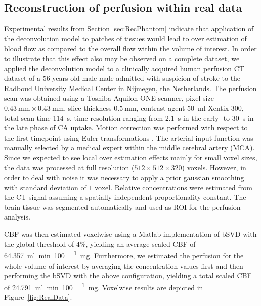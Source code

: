 \documentclass[journal,twocolumn]{IEEEtran}
\begin{document}
	
	\subsection{Reconstruction of perfusion within real data}\label{sec:RealData}
 	Experimental results from Section \ref{sec:RecPhantom} indicate that application of the deconvolution model to patches of tissues would lead to over estimation of blood flow as compared to the overall flow within the volume of interest.
	In order to illustrate that this effect also may be observed on a complete dataset, we applied the deconvolution model to a clinically acquired human perfusion CT dataset of a 56 years old male male admitted with suspicion of stroke to the Radboud University Medical Center in Nijmegen, the Netherlands.
	The perfusion scan was obtained using a Toshiba Aquilon ONE scanner, pixel-size $\SI{0.43}{\milli\meter}\times\SI{0.43}{\milli\meter}$, slice thickness $\SI{0.5}{\milli\meter}$, contrast agent \SI{50}{\milli\litre} Xentix 300, total scan-time \SI{114}{\second}, time resolution ranging from \SI{2.1}{\second} in the early- to \SI{30}{\second} in the late phase of CA uptake.
	Motion correction was performed with respect to the first timepoint using Euler transformations \cite{Mendrik11}.
	The arterial input function was manually selected by a medical expert within the middle cerebral artery (MCA).
	Since we expected to see local over estimation effects mainly for small voxel sizes, the data was processed at full resolution ($512\times512\times320$) voxels. 
	However, in order to deal with noise it was necessary to apply a prior gaussian smoothing with standard deviation of $1$ voxel.	
	Relative concentrations were estimated from the CT signal assuming a spatially independent proportionality constant. The brain tissue was segmented automatically and used as ROI for the perfusion analysis.

	CBF was then estimated voxelwise using a Matlab implementation of bSVD with the global threshold of $4\%$, yielding an average scaled CBF of \SI{64.357}{\milli\litre\per\minute\per100\milli\gram}.
	Furthermore, we estimated the perfusion for the whole volume of interest by averaging the concentration values first and then performing the bSVD with the above configuration, yielding a total scaled CBF of \SI{24.791}{\milli\litre\per\minute\per100\milli\gram}.
	Voxelwise results are depicted in Figure~\ref{fig:RealData}.
\end{document}
